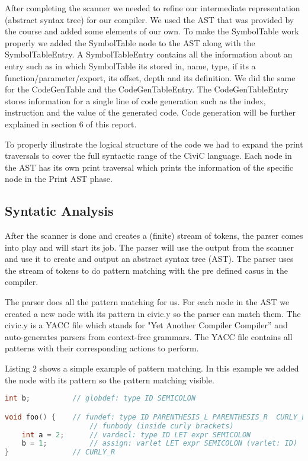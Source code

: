 \documentclass[hidelinks]{uva-inf-article}
\begin{document}
After completing the scanner we needed to refine our intermediate representation (abstract
syntax tree) for our compiler. We used the AST that was provided by the course and added some 
elements of our own. To make the SymbolTable work properly we added the SymbolTable node to the
AST along with the SymbolTableEntry. A SymbolTableEntry contains all the information about 
an entry such as in which SymbolTable its stored in, name, type, if its a function/parameter/export,
its offset, depth and its definition. We did the same for the CodeGenTable and the CodeGenTableEntry.
The CodeGenTableEntry stores information for a single line of code generation such as the
index, instruction and the value of the generated code. Code generation will be further 
explained in section 6 of this report.

To properly illustrate the logical structure of the code we had to expand the print traversals
to cover the full syntactic range of the CiviC language. Each node in the AST has its own
print traversal which prints the information of the specific node in the Print AST phase.

\newpage
\subsection{Syntatic Analysis}
After the scanner is done and creates a (finite) stream of tokens, the parser comes
into play and will start its job. The parser will use the output from the scanner and
use it to create and output an abstract syntax tree (AST). The parser uses the stream 
of tokens to do pattern matching with the pre defined casus in the compiler. 

The parser does all the pattern matching for us. For each node in the AST we created 
a new node with its pattern in civic.y so the parser can match them. The civic.y is a
YACC file which stands for "Yet Another Compiler Compiler” and auto-generates parsers
from context-free grammars. The YACC file contains all patterns with their corresponding
actions to perform.

Listing 2 shows a simple example of pattern matching. In this example we added the
node with its pattern so the pattern matching visible. 

\begin{lstlisting}[basicstyle=\small, language=C, label=lst:code-2, caption=Pattern matching Example, captionpos=b]
int b;          // globdef: type ID SEMICOLON

void foo() {    // fundef: type ID PARENTHESIS_L PARENTHESIS_R  CURLY_L
                    // funbody (inside curly brackets)
    int a = 2;      // vardecl: type ID LET expr SEMICOLON
    b = 1;          // assign: varlet LET expr SEMICOLON (varlet: ID)
}               // CURLY_R 
\end{lstlisting}
\end{document}
